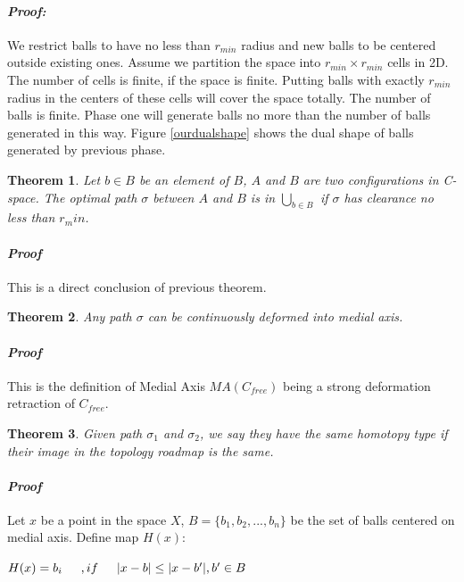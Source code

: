 \documentclass[11pt]{article}
\newtheorem{theorem}{Theorem}[section]
\begin{document}
  \paragraph{\emph{Proof:}} 
  \indent We restrict balls to have no less than $r_{min}$ radius and new balls to be centered outside existing ones. Assume we partition the space into $r_{min} \times r_{min}$ cells in 2D. The number of cells is finite, if the space is finite. Putting balls with exactly $r_{min}$ radius in the centers of these cells will cover the space totally. The number of balls is finite. Phase one will generate balls no more than the number of balls generated in this way. Figure \ref{ourdualshape} shows the dual shape of balls generated by previous phase.
  
  \begin{theorem}
  Let $b \in B$ be an element of $B$, $A$ and $B$ are two configurations in \emph{C-space}. The optimal path $\sigma$ between $A$ and $B$ is in $\bigcup_{b\in B}$ if $\sigma$ has clearance no less than $r_min$. 
  \end{theorem}   
  \paragraph{\emph{Proof}}
  \indent This is a direct conclusion of previous theorem.
  
  \begin{theorem}
  Any path $\sigma$ can be continuously deformed into medial axis. 
  \end{theorem}   
  \paragraph{\emph{Proof}}
  \indent This is the definition of Medial Axis $MA(C_{free})$ being a strong deformation retraction of $C_{free}$.
  
  \begin{theorem}
  Given path $\sigma_1$ and $\sigma_2$, we say they have the same homotopy type if their image in the topology roadmap is the same. 
  \end{theorem}
  \paragraph{\emph{Proof}}
  \indent Let $x$ be a point in the space $X$, $B = \{ b_1, b_2, ..., b_n \}$ be the set of balls centered on medial axis. Define map $H(x)$:
  
  $H(x) = b_i \indent, if \indent |x-b| \leq |x-b'|, b' \in B$  
 
\end{document}

